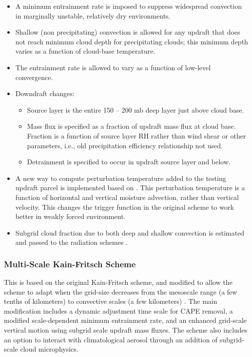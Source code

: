 \begin{itemize}\setlength{\parskip}{-4pt}
\item
 A minimum entrainment rate is imposed to suppress widespread convection 
in marginally unstable, relatively dry environments.

\item
Shallow (non precipitating) convection is allowed for any updraft 
that does not reach minimum cloud depth for precipitating clouds; 
this minimum depth varies as a function of cloud-base temperature.

\item
The entrainment rate is allowed to vary as a function of low-level convergence.

\item
Downdraft changes:

\begin{itemize}\setlength{\parskip}{-4pt}
\item
Source layer is the entire 150 -- 200 mb deep layer just above cloud base.

\item
Mass flux is specified as a fraction of updraft mass flux at cloud base.
Fraction is a function of source layer RH rather than wind shear 
or other parameters, i.e., old precipitation efficiency relationship not used.

\item
Detrainment is specified to occur in updraft source layer and below.
\end{itemize}

\item
A new way to compute perturbation temperature added to the testing updraft 
parcel is implemented based on \citet{ma2009}. This perturbation temperature
is a function of horizontal and vertical moisture advection, rather than vertical
velocity. This changes the trigger function in the original scheme to work better
in weakly forced environment.

\item
Subgrid cloud fraction due to both deep and shallow convection is estimated and passed
to the radiation schemes \citep{alapaty12}.
\end{itemize}

\subsubsection{Multi-Scale Kain-Fritsch Scheme}

This is based on the original Kain-Fritsch scheme, and modified to allow 
the scheme to adapt when the grid-size decreases from the mesoscale range (a few tenths 
of kilometers) to convective scales (a few kilometers) \citep{zheng16}. The main modification includes 
a dynamic adjustment time scale for CAPE removal, a modified scale-dependent minimum 
entrainment rate, and an enhanced grid-scale vertical motion using subgrid scale updraft 
mass fluxes. The scheme also includes an option to interact with climatological 
aerosol through an addition of subgrid-scale cloud microphysics.

